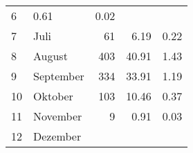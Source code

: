 \begin{longtable}{lXrrr}
       \num{6} &
       \num[round-mode=places,round-precision=2]{0,61} &
         \num[round-mode=places,round-precision=2]{0,02} \\

     7 &
     \multicolumn{1}{X}{ Juli   } &


       \num{61} &
       \num[round-mode=places,round-precision=2]{6,19} &
         \num[round-mode=places,round-precision=2]{0,22} \\

     8 &
     \multicolumn{1}{X}{ August   } &


       \num{403} &
       \num[round-mode=places,round-precision=2]{40,91} &
         \num[round-mode=places,round-precision=2]{1,43} \\

     9 &
     \multicolumn{1}{X}{ September   } &


       \num{334} &
       \num[round-mode=places,round-precision=2]{33,91} &
         \num[round-mode=places,round-precision=2]{1,19} \\

     10 &
     \multicolumn{1}{X}{ Oktober   } &


       \num{103} &
       \num[round-mode=places,round-precision=2]{10,46} &
         \num[round-mode=places,round-precision=2]{0,37} \\

     11 &
     \multicolumn{1}{X}{ November   } &


       \num{9} &
       \num[round-mode=places,round-precision=2]{0,91} &
         \num[round-mode=places,round-precision=2]{0,03} \\

     12 &
     \multicolumn{1}{X}{ Dezember   } &



\end{longtable}

